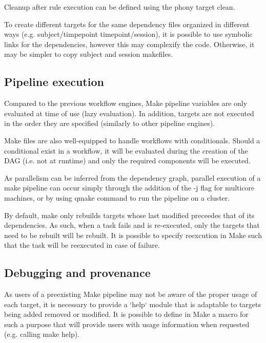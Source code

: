 \documentclass{report}
\begin{document}
Cleanup after rule execution can be defined using the phony target clean.

To create different targets for the same dependency files organized in different
ways (e.g. subject/timpepoint timepoint/session), it is possible to use symbolic
links for the dependencies, however this may complexify the code. Otherwise, it
may be simpler to copy subject and session makefiles.

        \subsection{Pipeline execution}

        Compared to the previous workflow engines, Make pipeline variables are
        only evaluated at time of use (lazy evaluation). In addition, targets
        are not executed in the order they are specified (similarly to other
        pipeline engines).

Make files are also well-equipped to handle workflows with conditionals. Should
a conditional exist in a workflow, it will be evaluated during the creation of
the DAG (i.e. not at runtime) and only the required components will be executed. 

        As parallelism can be inferred from the dependency graph, parallel
        execution of a make pipeline can occur simply through the addition of
        the -j flag for multicore machines, or by using qmake command to run the
        pipeline on a cluster.        

        By default, make only rebuilds targets whose last modified preceedes
        that of its dependencies. As such, when a task fails and is re-executed,
        only the targets that need to be rebuilt will be rebuilt. It is possible
        to specify reexcution in Make such that the task will be reexecuted in
        case of failure.
 
        \subsection{Debugging and provenance} As users of a preexisting Make
        pipeline may not be aware of the proper usage of each target, it is
        necessary to provide a `help` module that is adaptable to targets being
        added removed or modified. It is possible to define in Make a macro for
        such a purpose that will provide users with usage information when
        requested (e.g. calling make help).
\end{document}
